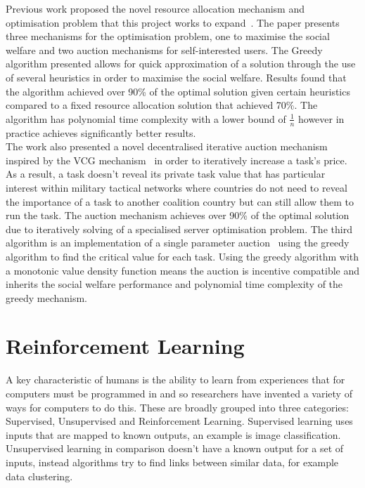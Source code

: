 Previous work proposed the novel resource allocation mechanism and optimisation problem that this project works to
expand~\citep{FlexibleResourceAllocation}. The paper presents three mechanisms for the optimisation problem,
one to maximise the social welfare and two auction mechanisms for self-interested users. The Greedy algorithm presented
allows for quick approximation of a solution through the use of several heuristics in order to maximise the social
welfare. Results found that the algorithm achieved over 90\% of the optimal solution given certain heuristics compared
to a fixed resource allocation solution that achieved 70\%. The algorithm has polynomial time complexity with a lower
bound of $\frac{1}{n}$ however in practice achieves significantly better results. \\
The work also presented a novel decentralised iterative auction mechanism inspired by the VCG
mechanism~\citep{vickrey, Clarke, groves} in order to iteratively increase a task's price. As a result, a task doesn't
reveal its private task value that has particular interest within military tactical networks where countries
do not need to reveal the importance of a task to another coalition country but can still allow them to run the task.
The auction mechanism achieves over 90\% of the optimal solution due to iteratively solving of a specialised server
optimisation problem. The third algorithm is an implementation of a single parameter
auction~\citep{nisan2007algorithmic_critical_value} using the greedy algorithm to find the critical value for each task.
Using the greedy algorithm with a monotonic value density function means the auction is incentive compatible and
inherits the social welfare performance and polynomial time complexity of the greedy mechanism.

\section{Reinforcement Learning}
\label{sec:reinforcement-learning}
A key characteristic of humans is the ability to learn from experiences that for computers must be programmed in and
so researchers have invented a variety of ways for computers to do this. These are broadly
grouped into three categories: Supervised, Unsupervised and Reinforcement Learning. Supervised learning uses inputs
that are mapped to known outputs, an example is image classification. Unsupervised learning in comparison doesn't have
a known output for a set of inputs, instead algorithms try to find links between similar data, for example data
clustering.

